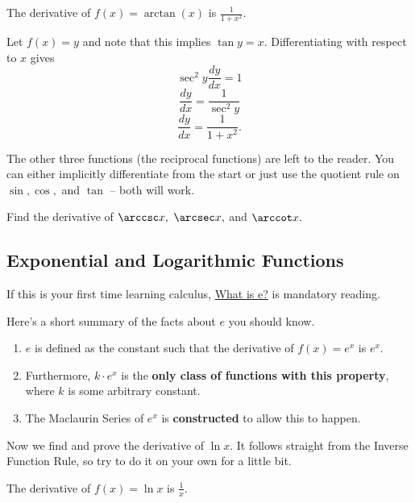 \documentclass{article}
\begin{document}
\begin{theo}
The derivative of $f(x)=\arctan(x)$ is $\frac{1}{1+x^2}.$
\end{theo}

\begin{pro}
Let $f(x)=y$ and note that this implies $\tan y=x.$ Differentiating with respect to $x$ gives
\[\sec^2y\frac{dy}{dx}=1\]
\[\frac{dy}{dx}=\frac{1}{\sec^2y}\]
\[\frac{dy}{dx}=\frac{1}{1+x^2}.\]
\end{pro}

The other three functions (the reciprocal functions) are left to the reader. You can either implicitly differentiate from the start or just use the quotient rule on $\sin,\cos,$ and $\tan$ -- both will work.

\begin{exer}
Find the derivative of $\arccsc x,$ $\arcsec x,$ and $\arccot x.$
\end{exer}

\subsection{Exponential and Logarithmic Functions}
If this is your first time learning calculus, \href{https://www.geometryexplorer.xyz/pdfs/calc/e.pdf}{What is e?} is mandatory reading.

Here's a short summary of the facts about $e$ you should know.

\begin{theo}
\hfill
\begin{enumerate}
\item $e$ is defined as the constant such that the derivative of $f(x)=e^x$ is $e^x.$
\item Furthermore, $k\cdot e^x$ is the \textbf{only class of functions with this property}, where $k$ is some arbitrary constant.
\item The Maclaurin Series of $e^x$ is \textbf{constructed} to allow this to happen.
\end{enumerate}
\end{theo}

Now we find and prove the derivative of $\ln x.$ It follows straight from the Inverse Function Rule, so try to do it on your own for a little bit.

\begin{theo}[Derivative of ln]
The derivative of $f(x)=\ln x$ is $\frac{1}{x}.$
\end{theo}
\end{document}
